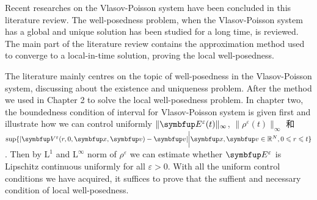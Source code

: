 \begin{eabstract}
Recent researches on the Vlasov-Poisson system have been concluded in this literature review. The well-posedness problem, when the Vlasov-Poisson system has a global and unique solution has been studied for a long time, is reviewed. The main part of the literature review contains the approximation method used to converge to a local-in-time solution, proving the local well-posedness. 


The literature mainly centres on the topic of well-posedness in the Vlasov-Poisson system, discussing about the existence and uniqueness problem. After the method we used in Chapter 2 to solve the local well-posedness problem. 
In chapter two, the boundedness condition of interval for Vlasov-Poisson system is given first and illustrate how we can control uniformly $\|\vE^\varepsilon(t)\|_\infty$, $\|\rho^\varepsilon(t)\|_\infty$ 和 $\sup \{|\vect{V}^\varepsilon(r,0,\vx,\vv)-\vv| \bigg|\vx,\vv \in \bbR^N, 0\leqslant r \leqslant t \}$. Then by $\mathrm{L}^1$ and $\mathrm{L}^\infty$ norm of  $\rho^\varepsilon$ we can estimate whether $\vE^\varepsilon$ is  Lipschitz continuous uniformly for all $\varepsilon >0$. With all the uniform control conditions we have acquired, it suffices to prove that the suffient and necessary condition of local well-posedness.


\end{eabstract}

  